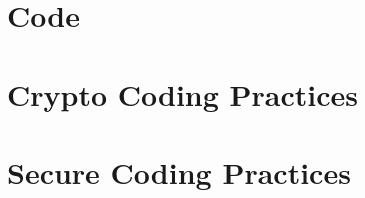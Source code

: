 \documentclass[a4paper]{article}
\begin{document}



\appendix

\section{Code}





\section{Crypto Coding Practices}

\section{Secure Coding Practices}
\end{document}
